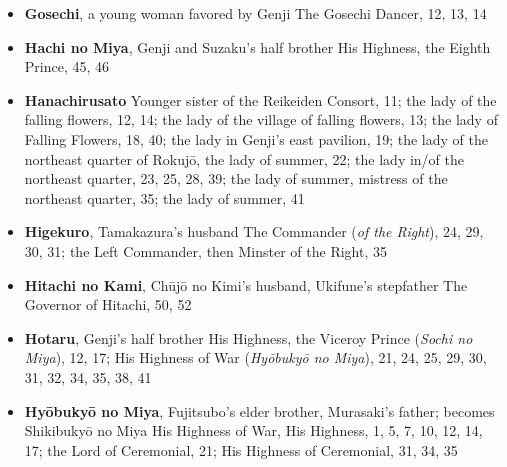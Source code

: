 \documentclass{article}
\begin{document}
\begin{multicols}{2}
\begin{itemize}[
			label=,
			leftmargin=0em,
			rightmargin=-1.5em,
			itemindent=-2em,
			nosep,
		]
		      Shōshō (\textit{serves Naka no Kimi}), 49, 50, 51;
		      Shōshō (\textit{serves Yokawa no Sōzu's sister, as a nun}), 53;
		      Taifu (\textit{serves Suetsumuhana}), 6;
		      Taifu (\textit{Kumoi no Kari's nurse}), 33;
		      Taifu (\textit{serves Tamakazura's younger daughter}), 44;
		      Taifu (\textit{serves Naka no Kimi}), 48, 49, 50;
		      Ukon (\textit{Yūgao's nurse, then serves Murasaki}), 4, 22;
		      Ukon (\textit{serves Naka no Kimi, also Taifu's daughter}), 50, 51;
		      Ukon (\textit{serves Ukifune at Uji, a daughter of Ukifune's nurse}), 52;
		      Yugei no Myōbu (\textit{serves Kiritsubo no Mikado}), 1

		\item \textbf{Gosechi}, a young woman favored by Genji The Gosechi Dancer, 12, 13, 14

		\item \textbf{Hachi no Miya}, Genji and Suzaku's half brother His Highness, the Eighth Prince, 45, 46

		\item \textbf{Hanachirusato} Younger sister of the Reikeiden Consort, 11;
		      the lady of the falling flowers, 12, 14;
		      the lady of the village of falling flowers, 13;
		      the lady of Falling Flowers, 18, 40;
		      the lady in Genji's east pavilion, 19;
		      the lady of the northeast quarter of Rokujō, the lady of summer, 22;
		      the lady in/of the northeast quarter, 23, 25, 28, 39;
		      the lady of summer, mistress of the northeast quarter, 35;
		      the lady of summer, 41

		\item \textbf{Higekuro}, Tamakazura's husband The Commander (\textit{of the Right}), 24, 29, 30, 31;
		      the Left Commander, then Minster of the Right, 35

		\item \textbf{Hitachi no Kami}, Chūjō no Kimi's husband, Ukifune's stepfather The Governor of Hitachi, 50, 52

		\item \textbf{Hotaru}, Genji's half brother His Highness, the Viceroy Prince (\textit{Sochi no Miya}), 12, 17;
		      His Highness of War (\textit{Hyōbukyō no Miya}), 21, 24, 25, 29, 30, 31, 32, 34, 35, 38, 41

		\item \textbf{Hyōbukyō no Miya}, Fujitsubo's elder brother, Murasaki's father; becomes Shikibukyō no Miya His Highness of War, His Highness, 1, 5, 7, 10, 12, 14, 17;
		      the Lord of Ceremonial, 21;
		      His Highness of Ceremonial, 31, 34, 35


\end{itemize}
\end{multicols}
\end{document}

